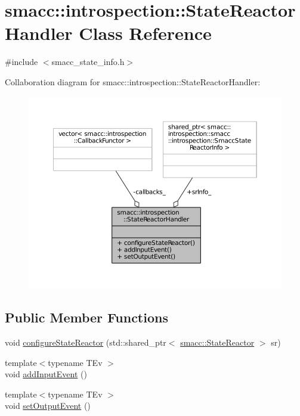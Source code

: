 \hypertarget{classsmacc_1_1introspection_1_1StateReactorHandler}{}\section{smacc\+:\+:introspection\+:\+:State\+Reactor\+Handler Class Reference}
\label{classsmacc_1_1introspection_1_1StateReactorHandler}


{\ttfamily \#include $<$smacc\+\_\+state\+\_\+info.\+h$>$}



Collaboration diagram for smacc\+:\+:introspection\+:\+:State\+Reactor\+Handler\+:
\nopagebreak
\begin{figure}[H]
\begin{center}
\leavevmode
\includegraphics[width=350pt]{classsmacc_1_1introspection_1_1StateReactorHandler__coll__graph}
\end{center}
\end{figure}
\subsection*{Public Member Functions}
\begin{DoxyCompactItemize}
\item 
void \hyperlink{classsmacc_1_1introspection_1_1StateReactorHandler_aa77393a686c942744851e4c97f197aba}{configure\+State\+Reactor} (std\+::shared\+\_\+ptr$<$ \hyperlink{classsmacc_1_1StateReactor}{smacc\+::\+State\+Reactor} $>$ sr)
\item 
{\footnotesize template$<$typename T\+Ev $>$ }\\void \hyperlink{classsmacc_1_1introspection_1_1StateReactorHandler_aef392b9521dc4484ef84082844cd3538}{add\+Input\+Event} ()
\item 
{\footnotesize template$<$typename T\+Ev $>$ }\\void \hyperlink{classsmacc_1_1introspection_1_1StateReactorHandler_a19af3db16879ed02048f08d9221d361a}{set\+Output\+Event} ()
\end{DoxyCompactItemize}
